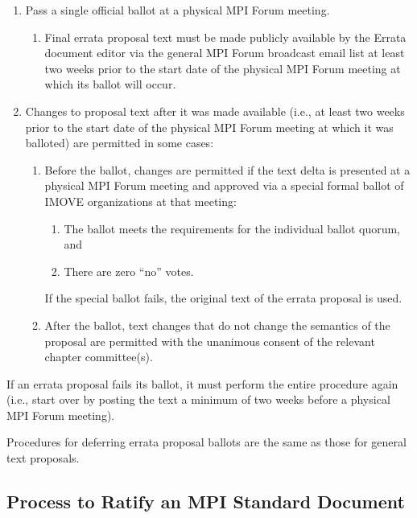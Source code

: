 \begin{enumerate}

\item Pass a single official ballot at a physical MPI Forum meeting.
  \begin{enumerate}
  \item Final errata proposal text must be made publicly available by
    the Errata document editor via the general MPI Forum broadcast
    email list at least two weeks prior to the start date of the
    physical MPI Forum meeting at which its ballot will occur.
  \end{enumerate}

\item Changes to proposal text after it was made available (i.e., at
  least two weeks prior to the start date of the physical MPI Forum
  meeting at which it was balloted) are permitted in some cases:
  \begin{enumerate}
  \item Before the ballot, changes are permitted if the text delta is
    presented at a physical MPI Forum meeting and approved via a
    special formal ballot of IMOVE organizations at that meeting:
    \begin{enumerate}
    \item The ballot meets the requirements for the individual
      ballot quorum, and
    \item There are zero ``no'' votes.
    \end{enumerate}

    If the special ballot fails, the original text of the errata
    proposal is used.
  \item After the ballot, text changes that do not change the
    semantics of the proposal are permitted with the unanimous consent
    of the relevant chapter committee(s).
  \end{enumerate}
\end{enumerate}

If an errata proposal fails its ballot, it must perform the entire
procedure again (i.e., start over by posting the text a minimum of two
weeks before a physical MPI Forum meeting).

Procedures for deferring errata proposal ballots are the same as
those for general text proposals.


\subsection{Process to Ratify an MPI Standard Document}

